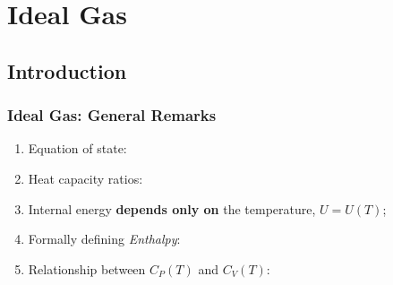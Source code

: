 \documentclass[10pt,compress]{beamer}
\begin{document}
\section{Ideal Gas}

\subsection{Introduction}

\begin{frame}
 \frametitle{Ideal Gas: General Remarks}
     \begin{enumerate}
        \item<1-> Equation of state:
        \item<2-> Heat capacity ratios:
        \item<3-> Internal energy {\bf depends only on} the temperature, $U = U(T)$;    
        \item<4-> Formally defining {\it Enthalpy}:
        \item<5-> Relationship between $C_{P}(T)$ and $C_{V}(T)$:
     \end{enumerate} 
  \normalsize
\end{frame}


\end{document}
